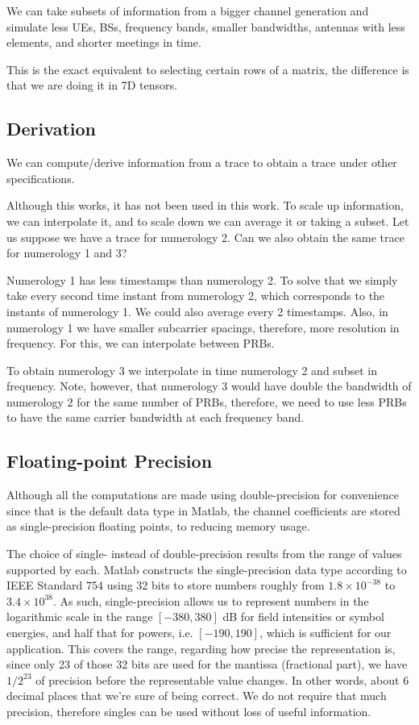 We can take subsets of information from a bigger channel generation and simulate less UEs, BSs, frequency bands, smaller bandwidths, antennas with less elements, and shorter meetings in time.

This is the exact equivalent to selecting certain rows of a matrix, the difference is that we are doing it in 7D tensors.

\subsection*{Derivation}

We can compute/derive information from a trace to obtain a trace under other specifications.

Although this works, it has not been used in this work. To scale up information, we can interpolate it, and to scale down we can average it or taking a subset. Let us suppose we have a trace for numerology 2. Can we also obtain the same trace for numerology 1 and 3?

Numerology 1 has less timestamps than numerology 2. To solve that we simply take every second time instant from numerology 2, which corresponds to the instants of numerology 1. We could also average every 2 timestamps. Also, in numerology 1 we have smaller subcarrier spacings, therefore, more resolution in frequency. For this, we can interpolate between PRBs. 

To obtain numerology 3 we interpolate in time numerology 2 and subset in frequency. Note, however, that numerology 3 would have double the bandwidth of numerology 2 for the same number of PRBs, therefore, we need to use less PRBs to have the same carrier bandwidth at each frequency band.

\subsection*{Floating-point Precision}
Although all the computations are made using double-precision for convenience since that is the default data type in Matlab, the channel coefficients are stored as single-precision floating points, to reducing memory usage.

The choice of single- instead of double-precision results from the range of values supported by each. Matlab constructs the single-precision data type according to IEEE Standard 754 \cite{IEEE754} using 32 bits to store numbers roughly from $1.8 \times 10^{-38}$ to $3.4 \times 10^{38}$. As such, single-precision allows us to represent numbers in the logarithmic scale in the range $\left[-380, 380\right]$ dB for field intensities or symbol energies, and half that for powers, i.e. $\left[-190, 190\right]$, which is sufficient for our application. This covers the range, regarding how precise the representation is, since only 23 of those 32 bits are used for the mantissa (fractional part), we have $1 / 2^23$ of precision before the representable value changes. In other words, about 6 decimal places that we're sure of being correct. We do not require that much precision, therefore singles can be used without loss of useful information.

